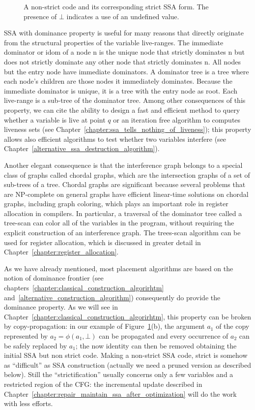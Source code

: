 \begin{figure}
\caption{\label{fig:properties_and_flavors:dom_property}A non-strict code and its corresponding strict SSA form. The presence of $\bot$ indicates a use of an undefined value.}
\end{figure}


SSA with dominance property is useful for many reasons that directly originate from the structural properties of the variable live-ranges. 
The immediate dominator or idom of a node n is the unique node that strictly dominates n but does not strictly dominate any other node that strictly dominates n. All nodes but the entry node have immediate dominators. A dominator tree is a tree where each node's children are those nodes it immediately dominates. Because the immediate dominator is unique, it is a tree with the entry node as root. Each live-range is a sub-tree of the dominator tree. 
Among other consequences of this property, we can cite the ability to design a fast and efficient method to query whether a variable is live at point $q$ or an iteration free algorithm to computes liveness sets (see Chapter~\ref{chapter:ssa_tells_nothing_of_liveness}); this property allows also efficient algorithms to test whether two variables interfere (see Chapter~\ref{alternative_ssa_destruction_algorithm}). 

Another elegant consequence is that the interference graph belongs to a special class of
graphs called chordal graphs, which are the intersection graphs of a set
of sub-trees of a tree. Chordal graphs are significant because several
problems that are NP-complete on general graphs have efficient linear-time
solutions on chordal graphs, including graph coloring, which plays
an important role in register allocation in compilers. In particular,
a traversal of the dominator tree called a tree-scan can color all of
the variables in the program, without requiring the explicit construction
of an interference graph. The trees-scan algorithm can be used
for register allocation, which is discussed
in greater detail in Chapter~\ref{chapter:register_allocation}. 

As we have already mentioned, most \phifun placement algorithms are based on the notion of dominance frontier (see chapters~\ref{chapter:classical_construction_algorirhtm} and~\ref{alternative_construction_algorithm}) consequently do provide the dominance property. As we will see in Chapter~\ref{chapter:classical_construction_algorirhtm}, this property can be broken by copy-propagation: in our example of Figure~\ref{fig:properties_and_flavors:dom_property}(b), the argument $a_1$ of the copy represented by $a_2=\phi(a_1,\bot)$ can be propagated and every occurrence of $a_2$ can be safely replaced by $a_1$; the now identity \phifun can then be removed obtaining the initial SSA but non strict code. Making a non-strict SSA code, strict is somehow as ``difficult'' as SSA construction (actually we need a pruned version as described below). Still the ``strictification'' usually concerns only a few variables and a restricted region of the CFG: the incremental update described in Chapter~\ref{chapter:repair_maintain_ssa_after_optimization} will do the work with less efforts.

